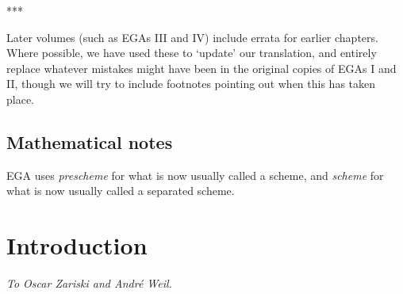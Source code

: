 \documentclass[openany,oneside]{amsbook}
\theoremstyle{ega-env-style}
\theoremstyle{ega-thm-env-style}
\theoremstyle{ega-defn-env-style}
\def\sectionbreak{\begin{center}***\end{center}}
\begin{document}
\sectionbreak

Later volumes (such as EGAs III and IV) include errata for earlier chapters.
Where possible, we have used these to `update' our translation, and entirely replace whatever mistakes might have been in the original copies of EGAs I and II, though we will try to include footnotes pointing out when this has taken place.

\section*{Mathematical notes}
EGA uses \emph{prescheme} for what is now usually called a scheme, and \emph{scheme} for what is now usually called a separated scheme.

\nocite{*}



\chapter*{Introduction}

\label{section-phantom}


\begin{flushright}
\emph{To Oscar Zariski and Andr\'e Weil.}
\end{flushright}
\medskip
\end{document}
